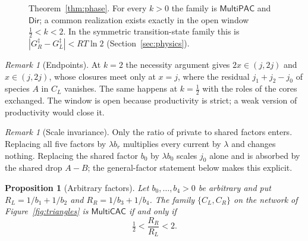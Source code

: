 \documentclass[11pt,a4paper]{article}
\theoremstyle{plain}
\newtheorem{proposition}[theorem]{Proposition}
\theoremstyle{definition}
\theoremstyle{remark}
\newtheorem{remark}[theorem]{Remark}
\newcommand{\MPAC}{\mathsf{MultiPAC}}
\newcommand{\MCAC}{\mathsf{MultiCAC}}
\newcommand{\DIR}{\mathsf{Dir}}
\begin{document}
\begin{figure}[t]
\centering
{}
\caption{Theorem~\ref{thm:phase}. For every $k>0$ the family is $\MPAC$ and $\DIR$; a common realization exists exactly in the open window $\tfrac12<k<2$. In the symmetric transition-state family this is $|G_R^{\ddagger}-G_L^{\ddagger}|<RT\ln2$ (Section~\ref{sec:physics}).}
\label{fig:phase}
\end{figure}

\begin{remark}[Endpoints]
At $k=2$ the necessity argument gives $2x\in(j,2j)$ and $x\in(j,2j)$, whose closures meet only at $x=j$, where the residual $j_1+j_2-j_0$ of species $A$ in $C_L$ vanishes. The same happens at $k=\tfrac12$ with the roles of the cores exchanged. The window is open because productivity is strict; a weak version of productivity would close it.
\end{remark}

\begin{remark}[Scale invariance]
Only the ratio of private to shared factors enters. Replacing all five factors by $\lambda b_r$ multiplies every current by $\lambda$ and changes nothing. Replacing the shared factor $b_0$ by $\lambda b_0$ scales $j_0$ alone and is absorbed by the shared drop $A-B$; the general-factor statement below makes this explicit.
\end{remark}

\begin{proposition}[Arbitrary factors]\label{prop:generalphase}
Let $b_0,\dots,b_4>0$ be arbitrary and put $R_L=1/b_1+1/b_2$ and $R_R=1/b_3+1/b_4$. The family $\{C_L,C_R\}$ on the network of Figure~\ref{fig:triangles} is $\MCAC$ if and only if
\[
  \tfrac12<\frac{R_R}{R_L}<2 .
\]
\end{proposition}
\end{document}
